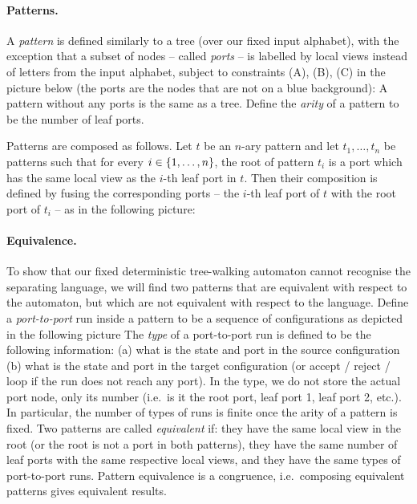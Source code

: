 \paragraph*{Patterns.} A \emph{pattern} is defined similarly to a tree (over our fixed input alphabet), with the exception that a subset of nodes --  called \emph{ports} -- is  labelled by local views instead of letters from the input alphabet,  subject to constraints (A), (B), (C) in the picture below (the ports are the nodes that are not on a blue background):
A pattern without any ports is the same  as a tree.  Define the \emph{arity} of a pattern to be the number of leaf ports. 

Patterns are composed as follows. Let $t$ be an $n$-ary pattern and let  $t_1,\ldots,t_n$ be patterns such that for every  $i \in \{1,\ldots,n\}$, the root of pattern $t_i$  is a port which  has the  same local view as the $i$-th leaf port in $t$. Then their composition is defined by fusing the corresponding ports -- the $i$-th leaf port of $t$ with the root port of $t_i$ --  as in the following picture:

\paragraph*{Equivalence.} To show that our fixed deterministic tree-walking automaton cannot recognise the separating language,  we will find two patterns that are equivalent with respect to the automaton, but which are not equivalent with respect to the language. Define a \emph{port-to-port} run  inside a pattern  to be a sequence of configurations as depicted in the following picture
 The \emph{type} of a port-to-port run  is defined to be the following information: (a) what is the state and port in the source configuration (b) what is the state and port in the target configuration (or accept / reject / loop if the run does not reach any port).  In the type, we do not store the actual port node, only its number (i.e.~is it the root port, leaf port 1, leaf port 2, etc.). In particular, the number of types of runs is finite once the arity of a pattern is fixed. Two patterns are called \emph{equivalent} if: they have the same local view in the root (or the root is not a port in both patterns), they have the same number of leaf ports with the same respective local views, and they have  the same types of port-to-port runs. Pattern equivalence  is a congruence, i.e.~composing equivalent patterns gives equivalent results.
 
